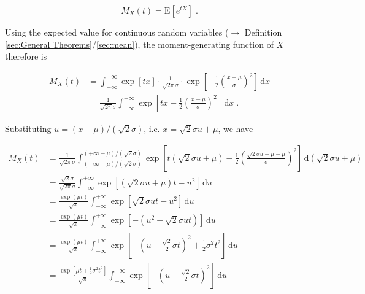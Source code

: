 \documentclass[a4paper,12pt]{book}
\begin{document}
\begin{equation} \label{eq:norm-mgf-mgf-var}
M_X(t) = \mathrm{E} \left[ e^{tX} \right] \; .
\end{equation}

Using the expected value for continuous random variables ($\rightarrow$ Definition \ref{sec:General Theorems}/\ref{sec:mean}), the moment-generating function of $X$ therefore is

\begin{equation} \label{eq:norm-mgf-norm-mgf-s1}
\begin{split}
M_X(t) &= \int_{-\infty}^{+\infty} \exp[tx] \cdot \frac{1}{\sqrt{2 \pi} \sigma} \cdot \exp \left[ -\frac{1}{2} \left( \frac{x-\mu}{\sigma} \right)^2 \right] \, \mathrm{d}x \\
&= \frac{1}{\sqrt{2 \pi} \sigma} \int_{-\infty}^{+\infty} \exp\left[ tx - \frac{1}{2} \left( \frac{x-\mu}{\sigma} \right)^2 \right] \, \mathrm{d}x \; .
\end{split}
\end{equation}

Substituting $u = (x-\mu)/(\sqrt{2}\sigma)$, i.e. $x = \sqrt{2}\sigma u + \mu$, we have

\begin{equation} \label{eq:norm-mgf-norm-mgf-s2}
\begin{split}
M_X(t) &= \frac{1}{\sqrt{2 \pi} \sigma} \int_{(-\infty-\mu)/(\sqrt{2}\sigma)}^{(+\infty-\mu)/(\sqrt{2}\sigma)} \exp\left[ t\left( \sqrt{2} \sigma u + \mu \right) - \frac{1}{2} \left( \frac{ \sqrt{2} \sigma u + \mu - \mu}{\sigma} \right)^2 \right] \, \mathrm{d}\left( \sqrt{2} \sigma u + \mu \right) \\
&= \frac{\sqrt{2} \sigma}{\sqrt{2 \pi} \sigma} \int_{-\infty}^{+\infty} \exp\left[ \left( \sqrt{2} \sigma u + \mu \right) t - u^2 \right] \, \mathrm{d}u \\
&= \frac{\exp(\mu t)}{\sqrt{\pi}} \int_{-\infty}^{+\infty} \exp\left[ \sqrt{2} \sigma u t - u^2 \right] \, \mathrm{d}u \\
&= \frac{\exp(\mu t)}{\sqrt{\pi}} \int_{-\infty}^{+\infty} \exp\left[ - \left( u^2 - \sqrt{2} \sigma u t \right) \right] \, \mathrm{d}u \\
&= \frac{\exp(\mu t)}{\sqrt{\pi}} \int_{-\infty}^{+\infty} \exp\left[ - \left( u - \frac{\sqrt{2}}{2} \sigma t \right)^2 + \frac{1}{2} \sigma^2 t^2 \right] \, \mathrm{d}u \\
&= \frac{\exp\left[ \mu t + \frac{1}{2} \sigma^2 t^2 \right]}{\sqrt{\pi}} \int_{-\infty}^{+\infty} \exp\left[ - \left( u - \frac{\sqrt{2}}{2} \sigma t \right)^2 \right] \, \mathrm{d}u
\end{split}
\end{equation}
\end{document}
